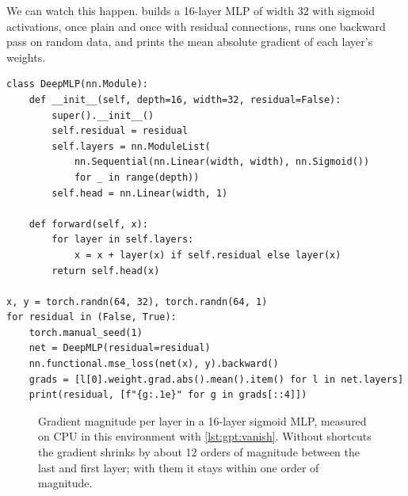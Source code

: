 We can watch this happen.  builds a 16-layer MLP of width 32 with sigmoid
activations, once plain and once with residual connections, runs one backward pass on random data,
and prints the mean absolute gradient of each layer's weights.

\begin{lstlisting}[caption={A vanishing-gradient experiment (our own setup).},label={lst:gpt:vanish}]
class DeepMLP(nn.Module):
    def __init__(self, depth=16, width=32, residual=False):
        super().__init__()
        self.residual = residual
        self.layers = nn.ModuleList(
            nn.Sequential(nn.Linear(width, width), nn.Sigmoid())
            for _ in range(depth))
        self.head = nn.Linear(width, 1)

    def forward(self, x):
        for layer in self.layers:
            x = x + layer(x) if self.residual else layer(x)
        return self.head(x)

x, y = torch.randn(64, 32), torch.randn(64, 1)
for residual in (False, True):
    torch.manual_seed(1)
    net = DeepMLP(residual=residual)
    nn.functional.mse_loss(net(x), y).backward()
    grads = [l[0].weight.grad.abs().mean().item() for l in net.layers]
    print(residual, [f"{g:.1e}" for g in grads[::4]])
\end{lstlisting}

\begin{figure}[t]
\centering
{}
\caption{Gradient magnitude per layer in a 16-layer sigmoid MLP, measured on CPU in this
environment with \cref{lst:gpt:vanish}. Without shortcuts the gradient shrinks by about 12 orders
of magnitude between the last and first layer; with them it stays within one order of magnitude.}
\label{fig:gpt:vanish}
\end{figure}


